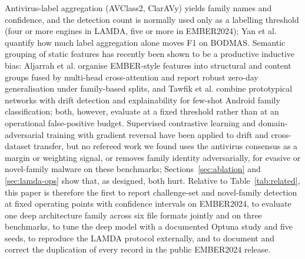 \documentclass[fleqn,10pt]{wlscirep}
\begin{document}
Antivirus-label aggregation (AVClass2, ClarAVy) yields family names and confidence, and the detection count is normally used only as a labelling threshold (four or more engines in LAMDA, five or more in EMBER2024); Yan et al.\cite{yan2022labelbias} quantify how much label aggregation alone moves F1 on BODMAS. Semantic grouping of static features has recently been shown to be a productive inductive bias: Aljarrah et al.\cite{aljarrah2026crossattention} organise EMBER-style features into structural and content groups fused by multi-head cross-attention and report robust zero-day generalisation under family-based splits, and Tawfik et al.\cite{tawfik2026fewshot} combine prototypical networks with drift detection and explainability for few-shot Android family classification; both, however, evaluate at a fixed threshold rather than at an operational false-positive budget. Supervised contrastive learning\cite{khosla2020supcon} and domain-adversarial training with gradient reversal\cite{ganin2016dann} have been applied to drift and cross-dataset transfer, but no refereed work we found uses the antivirus consensus as a margin or weighting signal, or removes family identity adversarially, for evasive or novel-family malware on these benchmarks; Sections~\ref{sec:ablation} and \ref{sec:lamda-ops} show that, as designed, both hurt. Relative to Table~\ref{tab:related}, this paper is therefore the first to report challenge-set and novel-family detection at fixed operating points with confidence intervals on EMBER2024, to evaluate one deep architecture family across six file formats jointly and on three benchmarks, to tune the deep model with a documented Optuna study and five seeds, to reproduce the LAMDA protocol externally, and to document and correct the duplication of every record in the public EMBER2024 release.
\end{document}
